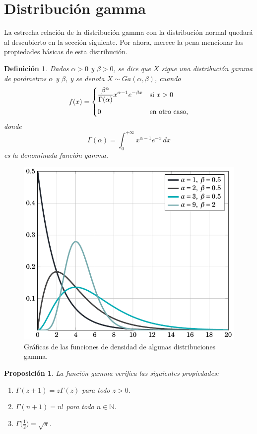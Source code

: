 \documentclass[11pt]{report}
\newtheorem{proposition}{Proposición}
\newtheorem{definition}{Definición}
\theoremstyle{definition}
\newcommand{\N}{\mathbb N}
\begin{document}
\section{Distribución gamma}

La estrecha relación de la distribución gamma con la distribución normal quedará al descubierto en la sección siguiente. Por ahora, merece la pena mencionar las propiedades básicas de esta distribución.

\begin{definition}
Dados $\alpha > 0$ y $\beta >0$, se dice que $X$ sigue una \emph{distribución gamma de parámetros $\alpha$ y $\beta$}, y se denota $X \sim Ga(\alpha,\beta)$, cuando
    \[f(x) =\begin{cases}
        \displaystyle \frac{\beta^\alpha}{\Gamma(\alpha)}x^{\alpha-1}e^{-\beta x} & $si $ x>0 \\[10pt]
        0 & $en otro caso,$
    \end{cases} \]
    donde
    \[\Gamma(\alpha)=\int_0^{+\infty} x^{\alpha-1}e^{-x} \, dx\]
    es la denominada \emph{función gamma}.
\end{definition}

\begin{figure}[H]
    \centering
    \includegraphics{ie_plot_gamma.pdf}
    \caption{Gráficas de las funciones de densidad de algunas distribuciones gamma.}
\end{figure}

\begin{proposition}
La función gamma verifica las siguientes propiedades:
\begin{enumerate}
    \item $\Gamma(z+1)=z\Gamma(z)$ para todo $z >0$.
    \item $\Gamma(n+1)=n!$ para todo $n \in \N$.
    \item $\displaystyle \Gamma\bigl(\frac{1}{2}\bigr) = \sqrt{\pi}$.
\end{enumerate}
\end{proposition}
\end{document}
